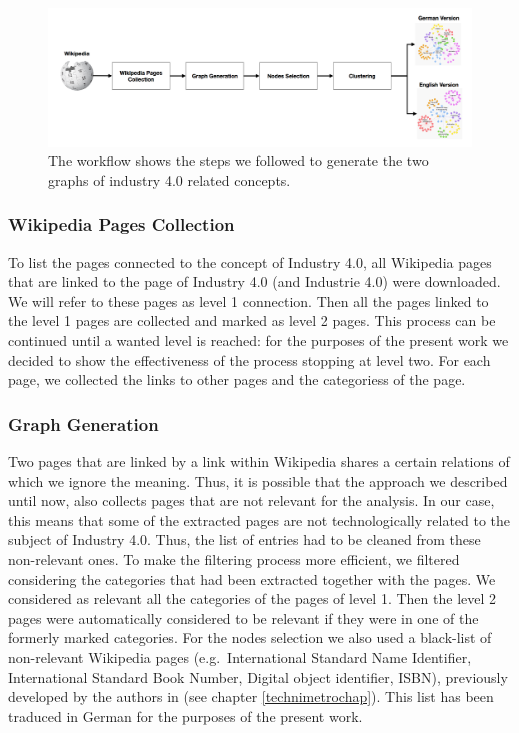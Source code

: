 \documentclass[]{book}
\begin{document}
\begin{figure}

{\centering \includegraphics[width=1\linewidth]{_bookdown_files/figures/industrie_wf} 

}

\caption{The workflow shows the steps we followed to generate the two graphs of industry 4.0 related concepts.}\label{fig:industriewf}
\end{figure}

\subsubsection*{Wikipedia Pages
Collection}\label{wikipedia-pages-collection}

To list the pages connected to the concept of Industry 4.0, all
Wikipedia pages that are linked to the page of Industry 4.0 (and
Industrie 4.0) were downloaded. We will refer to these pages as level 1
connection. Then all the pages linked to the level 1 pages are collected
and marked as level 2 pages. This process can be continued until a
wanted level is reached: for the purposes of the present work we decided
to show the effectiveness of the process stopping at level two. For each
page, we collected the links to other pages and the categoriess of the
page.

\subsubsection*{Graph Generation}\label{graph-generation}

Two pages that are linked by a link within Wikipedia shares a certain
relations of which we ignore the meaning. Thus, it is possible that the
approach we described until now, also collects pages that are not
relevant for the analysis. In our case, this means that some of the
extracted pages are not technologically related to the subject of
Industry 4.0. Thus, the list of entries had to be cleaned from these
non-relevant ones. To make the filtering process more efficient, we
filtered considering the categories that had been extracted together
with the pages. We considered as relevant all the categories of the
pages of level 1. Then the level 2 pages were automatically considered
to be relevant if they were in one of the formerly marked categories.
For the nodes selection we also used a black-list of non-relevant
Wikipedia pages (e.g.~International Standard Name Identifier,
International Standard Book Number, Digital object identifier, ISBN),
previously developed by the authors in (see chapter
\ref{technimetrochap}). This list has been traduced in German for the
purposes of the present work.
\end{document}
